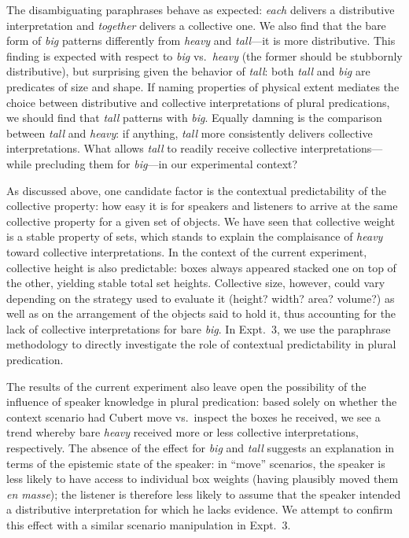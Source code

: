 \documentclass[preprint,12pt,authoryear,titlepage]{elsarticle}
\begin{document}
The disambiguating paraphrases behave as expected: \emph{each} delivers a distributive interpretation and \emph{together} delivers a collective one. We also find that the bare form of \emph{big} patterns differently from \emph{heavy} and \emph{tall}---it is more distributive. This finding is expected with respect to \textit{big} vs.~\textit{heavy} (the former should be stubbornly distributive), but surprising given the behavior of \textit{tall}: both \emph{tall} and \emph{big} are predicates of size and shape. If naming properties of physical extent mediates the choice between distributive and collective interpretations of plural predications, we should find that \emph{tall} patterns with \emph{big}. Equally damning is the comparison between \emph{tall} and \emph{heavy}: if anything, \emph{tall} more consistently delivers collective interpretations. What allows \emph{tall} to readily receive collective interpretations---while precluding them for \emph{big}---in our experimental context? 

As discussed above, one candidate factor is the contextual predictability of the collective property: how easy it is for speakers and listeners to arrive at the same collective property for a given set of objects. We have seen that collective weight is a stable property of sets, which stands to explain the complaisance of \emph{heavy} toward collective interpretations. In the context of the current experiment, collective height is also predictable: boxes  always appeared stacked one on top of the other, yielding stable total set heights. Collective size, however, could vary depending on the strategy used to evaluate it (height? width? area? volume?) as well as on the arrangement of the objects said to hold it, thus accounting for the lack of collective interpretations for bare \emph{big}. In Expt.~3, we use the paraphrase methodology to directly investigate the role of contextual predictability in plural predication.

The results of the current experiment also leave open the possibility of the influence of speaker knowledge in plural predication: based solely on whether the context scenario had Cubert move vs.~inspect the boxes he received, we see a trend whereby bare \emph{heavy} received more or less collective interpretations, respectively. The absence of the effect for \emph{big} and \emph{tall} suggests an explanation in terms of the epistemic state of the speaker: in ``move'' scenarios, the speaker is less likely to have access to individual box weights (having plausibly moved them \emph{en masse}); the listener is therefore less likely to assume that the speaker intended a distributive interpretation for which he lacks evidence. We attempt to confirm this effect with a similar scenario manipulation in Expt.~3.
\end{document}
